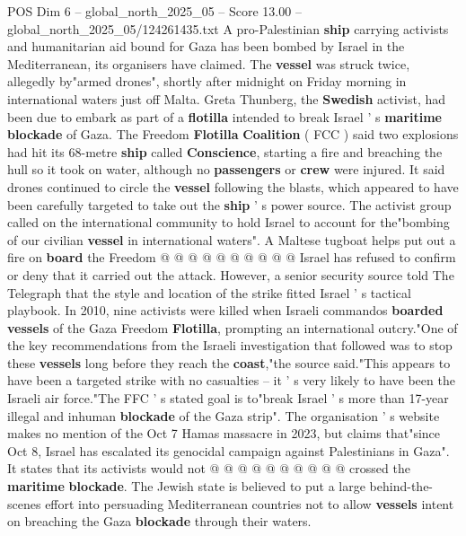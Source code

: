\begin{textsample}{POS Dim 6 – global\_north\_2025\_05 – Score 13.00 – global\_north\_2025\_05/124261435.txt}  \label{ex:f6_pos_048}
A pro-Palestinian \textbf{ship} carrying activists and humanitarian aid bound for Gaza has been bombed by Israel in the Mediterranean, its organisers have claimed.
The \textbf{vessel} was struck twice, allegedly by"armed drones", shortly after midnight on Friday morning in international waters just off Malta.
Greta Thunberg, the \textbf{Swedish} activist, had been due to embark as part of a \textbf{flotilla} intended to break Israel ' s \textbf{maritime} \textbf{blockade} of Gaza.
The Freedom \textbf{Flotilla} \textbf{Coalition} ( FCC ) said two explosions had hit its 68-metre \textbf{ship} called \textbf{Conscience}, starting a fire and breaching the hull so it took on water, although no \textbf{passengers} or \textbf{crew} were injured.
It said drones continued to circle the \textbf{vessel} following the blasts, which appeared to have been carefully targeted to take out the \textbf{ship} ' s power source.
The activist group called on the international community to hold Israel to account for the"bombing of our civilian \textbf{vessel} in international waters".
A Maltese tugboat helps put out a fire on \textbf{board} the Freedom @ @ @ @ @ @ @ @ @ @ Israel has refused to confirm or deny that it carried out the attack.
However, a senior security source told The Telegraph that the style and location of the strike fitted Israel ' s tactical playbook.
In 2010, nine activists were killed when Israeli commandos \textbf{boarded} \textbf{vessels} of the Gaza Freedom \textbf{Flotilla}, prompting an international outcry."One of the key recommendations from the Israeli investigation that followed was to stop these \textbf{vessels} long before they reach the \textbf{coast},"the source said."This appears to have been a targeted strike with no casualties -- it ' s very likely to have been the Israeli air force."The FFC ' s stated goal is to"break Israel ' s more than 17-year illegal and inhuman \textbf{blockade} of the Gaza strip".
The organisation ' s website makes no mention of the Oct 7 Hamas massacre in 2023, but claims that"since Oct 8, Israel has escalated its genocidal campaign against Palestinians in Gaza".
It states that its activists would not @ @ @ @ @ @ @ @ @ @ crossed the \textbf{maritime} \textbf{blockade}.
The Jewish state is believed to put a large behind-the-scenes effort into persuading Mediterranean countries not to allow \textbf{vessels} intent on breaching the Gaza \textbf{blockade} through their waters.

\end{textsample}
